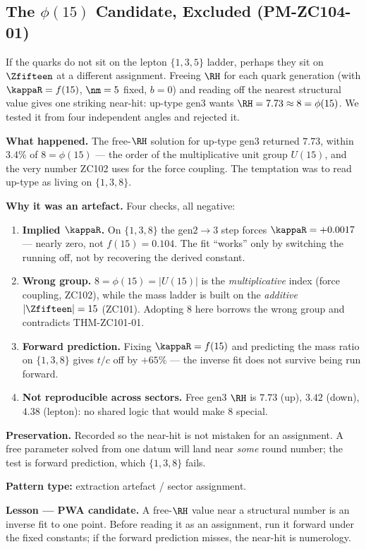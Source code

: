 \documentclass[12pt, a4paper]{article}
\begin{document}
\subsection{The $\phi(15)$ Candidate, Excluded (PM-ZC104-01)}
\label{sec:phi15-zc104}

If the quarks do not sit on the lepton $\{1,3,5\}$ ladder, perhaps they sit on
$\Zfifteen$ at a different assignment. Freeing $\RH$ for each quark generation
(with $\kappaR=f(15)$, $\nm=5$ fixed, $b=0$) and reading off the nearest
structural value gives one striking near-hit: up-type gen3 wants
$\RH=7.73\approx8=\phi(15)$. We tested it from four independent angles and
rejected it.

\begin{derivedbox}[title={PM-ZC104-01: $8=\phi(15)$ as an up-index --- an inverse fit that fails forward (Failure Stance)}]
\textbf{What happened.} The free-$\RH$ solution for up-type gen3 returned
$7.73$, within $3.4\%$ of $8=\phi(15)$ --- the order of the multiplicative unit
group $U(15)$, and the very number ZC102 uses for the force coupling. The
temptation was to read up-type as living on $\{1,3,8\}$.

\textbf{Why it was an artefact.} Four checks, all negative:
\begin{enumerate}[leftmargin=2em, noitemsep]
  \item \textbf{Implied $\kappaR$.} On $\{1,3,8\}$ the gen$2{\to}3$ step forces
    $\kappaR=+0.0017$ --- nearly zero, not $f(15)=0.104$. The fit ``works'' only
    by switching the running off, not by recovering the derived constant.
  \item \textbf{Wrong group.} $8=\phi(15)=|U(15)|$ is the \emph{multiplicative}
    index (force coupling, ZC102), while the mass ladder is built on the
    \emph{additive} $|\Zfifteen|=15$ (ZC101). Adopting $8$ here borrows the wrong
    group and contradicts THM-ZC101-01.
  \item \textbf{Forward prediction.} Fixing $\kappaR=f(15)$ and predicting the
    mass ratio on $\{1,3,8\}$ gives $t/c$ off by $+65\%$ --- the inverse fit does
    not survive being run forward.
  \item \textbf{Not reproducible across sectors.} Free gen3 $\RH$ is $7.73$ (up),
    $3.42$ (down), $4.38$ (lepton): no shared logic that would make $8$ special.
\end{enumerate}

\textbf{Preservation.} Recorded so the near-hit is not mistaken for an
assignment. A free parameter solved from one datum will land near \emph{some}
round number; the test is forward prediction, which $\{1,3,8\}$ fails.

\textbf{Pattern type:} extraction artefact / sector assignment.

\textbf{Lesson --- PWA candidate.} A free-$\RH$ value near a structural number is
an inverse fit to one point. Before reading it as an assignment, run it forward
under the fixed constants; if the forward prediction misses, the near-hit is
numerology.
\end{derivedbox}
\end{document}
